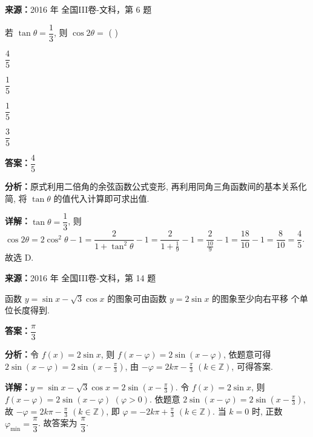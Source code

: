 \begin{question}[points=5]
\textbf{来源：}2016 年 全国III卷-文科，第 6 题\par
若 $\tan\theta=\dfrac{1}{3}$, 则 $\cos2\theta=$ ( )
\begin{choices}
  \item $\dfrac{4}{5}$
  \item $\dfrac{1}{5}$
  \item $\dfrac{1}{5}$
  \item $\dfrac{3}{5}$
\end{choices}
\begin{solution}
\textbf{答案：}$\dfrac{4}{5}$

\textbf{分析：}原式利用二倍角的余弦函数公式变形, 再利用同角三角函数间的基本关系化简, 将 $\tan\theta$ 的值代入计算即可求出值.

\textbf{详解：}$\tan\theta=\dfrac{1}{3}$, 则 $\cos2\theta=2\cos^2\theta-1=\dfrac{2}{1+\tan^2\theta}-1=\dfrac{2}{1+\frac{1}{9}}-1=\dfrac{2}{\frac{10}{9}}-1=\dfrac{18}{10}-1=\dfrac{8}{10}=\dfrac{4}{5}$. 故选 D.
\end{solution}
\end{question}

\begin{question}[points=5]
\textbf{来源：}2016 年 全国III卷-文科，第 14 题\par
函数 $y=\sin x-\sqrt{3}\cos x$ 的图象可由函数 $y=2\sin x$ 的图象至少向右平移  个单位长度得到.
\fillin[{$\dfrac{\pi}{3}$}]
\begin{solution}
\textbf{答案：}$\dfrac{\pi}{3}$

\textbf{分析：}令 $f(x)=2\sin x$, 则 $f(x-\varphi)=2\sin(x-\varphi)$, 依题意可得 $2\sin(x-\varphi)=2\sin(x-\frac{\pi}{3})$, 由 $-\varphi=2k\pi-\frac{\pi}{3}$ $(k\in\mathbb{Z})$, 可得答案.

\textbf{详解：}$y=\sin x-\sqrt{3}\cos x=2\sin(x-\frac{\pi}{3})$. 令 $f(x)=2\sin x$, 则 $f(x-\varphi)=2\sin(x-\varphi)$ $(\varphi>0)$. 依题意 $2\sin(x-\varphi)=2\sin(x-\frac{\pi}{3})$, 故 $-\varphi=2k\pi-\frac{\pi}{3}$ $(k\in\mathbb{Z})$, 即 $\varphi=-2k\pi+\frac{\pi}{3}$ $(k\in\mathbb{Z})$. 当 $k=0$ 时, 正数 $\varphi_{\min}=\dfrac{\pi}{3}$. 故答案为 $\dfrac{\pi}{3}$.
\end{solution}
\end{question}


